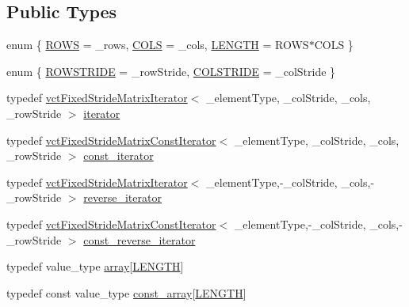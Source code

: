 \subsection*{Public Types}
\begin{DoxyCompactItemize}
\item 
enum \{ \hyperlink{classvct_fixed_size_matrix_traits_a99506cd46619256b0ad9c09afc88cfe4a4111cbfc8e82c98dfb13e63b65fc606b}{R\+O\+W\+S} = \+\_\+rows, 
\hyperlink{classvct_fixed_size_matrix_traits_a99506cd46619256b0ad9c09afc88cfe4af33df4089c668a48b5d59ac86af3138e}{C\+O\+L\+S} = \+\_\+cols, 
\hyperlink{classvct_fixed_size_matrix_traits_a99506cd46619256b0ad9c09afc88cfe4a6b0f4f5000cd410b68ea5903cd33ec2b}{L\+E\+N\+G\+T\+H} = R\+O\+W\+S$\ast$\+C\+O\+L\+S
 \}
\item 
enum \{ \hyperlink{classvct_fixed_size_matrix_traits_ac32aced1f46e5b302415ea1f2494dd40aef62e1a69a3a5647a2ade9f04f005f72}{R\+O\+W\+S\+T\+R\+I\+D\+E} = \+\_\+row\+Stride, 
\hyperlink{classvct_fixed_size_matrix_traits_ac32aced1f46e5b302415ea1f2494dd40ad831203257041b2517422372fd4faea2}{C\+O\+L\+S\+T\+R\+I\+D\+E} = \+\_\+col\+Stride
 \}
\item 
typedef \hyperlink{classvct_fixed_stride_matrix_iterator}{vct\+Fixed\+Stride\+Matrix\+Iterator}$<$ \+\_\+element\+Type, \+\_\+col\+Stride, \+\_\+cols, \+\_\+row\+Stride $>$ \hyperlink{classvct_fixed_size_matrix_traits_a677065481ada218e2559cdec92e97fd8}{iterator}
\item 
typedef \hyperlink{classvct_fixed_stride_matrix_const_iterator}{vct\+Fixed\+Stride\+Matrix\+Const\+Iterator}$<$ \+\_\+element\+Type, \+\_\+col\+Stride, \+\_\+cols, \+\_\+row\+Stride $>$ \hyperlink{classvct_fixed_size_matrix_traits_a8f7178fb03f45772c705fba16e08065d}{const\+\_\+iterator}
\item 
typedef \hyperlink{classvct_fixed_stride_matrix_iterator}{vct\+Fixed\+Stride\+Matrix\+Iterator}$<$ \+\_\+element\+Type,-\/\+\_\+col\+Stride, \+\_\+cols,-\/\+\_\+row\+Stride $>$ \hyperlink{classvct_fixed_size_matrix_traits_aa132098455575ae9bc4962c994273baa}{reverse\+\_\+iterator}
\item 
typedef \hyperlink{classvct_fixed_stride_matrix_const_iterator}{vct\+Fixed\+Stride\+Matrix\+Const\+Iterator}$<$ \+\_\+element\+Type,-\/\+\_\+col\+Stride, \+\_\+cols,-\/\+\_\+row\+Stride $>$ \hyperlink{classvct_fixed_size_matrix_traits_a362cff0931f811552609307e80af3eab}{const\+\_\+reverse\+\_\+iterator}
\item 
typedef value\+\_\+type \hyperlink{classvct_fixed_size_matrix_traits_a3894b24d65c8d4b54d17192001d28dc2}{array}\mbox{[}\hyperlink{classvct_fixed_size_matrix_traits_a99506cd46619256b0ad9c09afc88cfe4a6b0f4f5000cd410b68ea5903cd33ec2b}{L\+E\+N\+G\+T\+H}\mbox{]}
\item 
typedef const value\+\_\+type \hyperlink{classvct_fixed_size_matrix_traits_ac7459b07165b6f472e2f5238cc069b55}{const\+\_\+array}\mbox{[}\hyperlink{classvct_fixed_size_matrix_traits_a99506cd46619256b0ad9c09afc88cfe4a6b0f4f5000cd410b68ea5903cd33ec2b}{L\+E\+N\+G\+T\+H}\mbox{]}
\end{DoxyCompactItemize}
